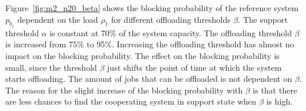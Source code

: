 Figure~\ref{fig:m2_n20_beta} shows the blocking probability of the reference system $p_{b_1}$ dependent on the load $\rho_1$ for different offloading thresholds $\beta$. The support threshold $\alpha$ is constant at 70\% of the system capacity. The offloading threshold $\beta$ is increased from 75\% to 95\%. Increasing the offloading threshold has almost no impact on the blocking probability. The effect on the blocking probability is small, since the threshold $\beta$ just shifts the point of time at which the system starts offloading. The amount of jobs that can be offloaded is not dependent on $\beta$. The reason for the slight increase of the blocking probability with $\beta$ is that there are less chances to find the cooperating system in support state when $\beta$ is high.


